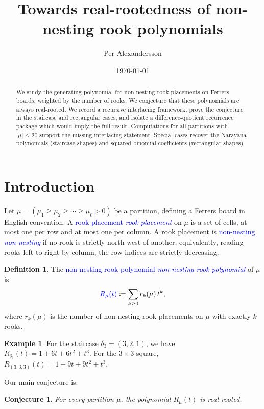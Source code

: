 \documentclass[11pt,reqno]{amsart}
\title{Towards real-rootedness of non-nesting rook polynomials}
\author{Per Alexandersson}
\date{\today}
\newtheorem{conjecture}[theorem]{Conjecture}
\theoremstyle{definition}
\newtheorem{definition}[theorem]{Definition}
\newtheorem{example}[theorem]{Example}
\newcommand{\defin}[1]{%
\relax\ifmmode%
\textcolor{blue}{#1}%
\else \textcolor{blue}{\emph{#1}}%
\fi%
}
\begin{document}
\begin{abstract}
We study the generating polynomial for non-nesting rook placements
on Ferrers boards, weighted by the number of rooks.
We conjecture that these polynomials are always real-rooted.
We record a recursive interlacing framework, prove the conjecture in
the staircase and rectangular cases, and isolate a difference-quotient
recurrence package which would imply the full result.
Computations for all partitions with $|\mu| \leq 20$
support the missing interlacing statement.
Special cases recover the Narayana polynomials (staircase shapes)
and squared binomial coefficients (rectangular shapes).
\end{abstract}

\maketitle

\section{Introduction}

Let $\mu = (\mu_1 \geq \mu_2 \geq \dotsb \geq \mu_\ell > 0)$
be a partition, defining a Ferrers board in English convention.
A \defin{rook placement} on $\mu$ is a set of cells, at most one per
row and at most one per column.
A rook placement is \defin{non-nesting} if no rook is strictly
north-west of another; equivalently, reading rooks left to right
by column, the row indices are strictly decreasing.

\begin{definition}
The \defin{non-nesting rook polynomial} of $\mu$ is
\[
   \defin{R_\mu(t)} \coloneqq \sum_{k \geq 0}
   r_k(\mu) \, t^k,
\]
where $r_k(\mu)$ is the number of non-nesting rook placements
on $\mu$ with exactly $k$ rooks.
\end{definition}

\begin{example}\label{ex:small}
For the staircase $\delta_3 = (3,2,1)$, we have $R_{\delta_3}(t) = 1 + 6t + 6t^2 + t^3$.
For the $3 \times 3$ square, $R_{(3,3,3)}(t) = 1 + 9t + 9t^2 + t^3$.
\end{example}

Our main conjecture is:

\begin{conjecture}\label{conj:main}
For every partition $\mu$, the polynomial $R_\mu(t)$ is real-rooted.
\end{conjecture}
\end{document}
